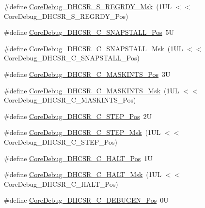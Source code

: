 \begin{DoxyCompactItemize}
\item 
\#define \hyperlink{group___c_m_s_i_s___core_debug_gac4cd6f3178de48f473d8903e8c847c07}{Core\-Debug\-\_\-\-D\-H\-C\-S\-R\-\_\-\-S\-\_\-\-R\-E\-G\-R\-D\-Y\-\_\-\-Msk}~(1\-U\-L $<$$<$ Core\-Debug\-\_\-\-D\-H\-C\-S\-R\-\_\-\-S\-\_\-\-R\-E\-G\-R\-D\-Y\-\_\-\-Pos)
\item 
\#define \hyperlink{group___c_m_s_i_s___core_debug_ga85747214e2656df6b05ec72e4d22bd6d}{Core\-Debug\-\_\-\-D\-H\-C\-S\-R\-\_\-\-C\-\_\-\-S\-N\-A\-P\-S\-T\-A\-L\-L\-\_\-\-Pos}~5\-U
\item 
\#define \hyperlink{group___c_m_s_i_s___core_debug_ga53aa99b2e39a67622f3b9973e079c2b4}{Core\-Debug\-\_\-\-D\-H\-C\-S\-R\-\_\-\-C\-\_\-\-S\-N\-A\-P\-S\-T\-A\-L\-L\-\_\-\-Msk}~(1\-U\-L $<$$<$ Core\-Debug\-\_\-\-D\-H\-C\-S\-R\-\_\-\-C\-\_\-\-S\-N\-A\-P\-S\-T\-A\-L\-L\-\_\-\-Pos)
\item 
\#define \hyperlink{group___c_m_s_i_s___core_debug_ga0d2907400eb948a4ea3886ca083ec8e3}{Core\-Debug\-\_\-\-D\-H\-C\-S\-R\-\_\-\-C\-\_\-\-M\-A\-S\-K\-I\-N\-T\-S\-\_\-\-Pos}~3\-U
\item 
\#define \hyperlink{group___c_m_s_i_s___core_debug_ga77fe1ef3c4a729c1c82fb62a94a51c31}{Core\-Debug\-\_\-\-D\-H\-C\-S\-R\-\_\-\-C\-\_\-\-M\-A\-S\-K\-I\-N\-T\-S\-\_\-\-Msk}~(1\-U\-L $<$$<$ Core\-Debug\-\_\-\-D\-H\-C\-S\-R\-\_\-\-C\-\_\-\-M\-A\-S\-K\-I\-N\-T\-S\-\_\-\-Pos)
\item 
\#define \hyperlink{group___c_m_s_i_s___core_debug_gae1fc39e80de54c0339cbb1b298a9f0f9}{Core\-Debug\-\_\-\-D\-H\-C\-S\-R\-\_\-\-C\-\_\-\-S\-T\-E\-P\-\_\-\-Pos}~2\-U
\item 
\#define \hyperlink{group___c_m_s_i_s___core_debug_gae6bda72fbd32cc5734ff3542170dc00d}{Core\-Debug\-\_\-\-D\-H\-C\-S\-R\-\_\-\-C\-\_\-\-S\-T\-E\-P\-\_\-\-Msk}~(1\-U\-L $<$$<$ Core\-Debug\-\_\-\-D\-H\-C\-S\-R\-\_\-\-C\-\_\-\-S\-T\-E\-P\-\_\-\-Pos)
\item 
\#define \hyperlink{group___c_m_s_i_s___core_debug_gaddf1d43f8857e4efc3dc4e6b15509692}{Core\-Debug\-\_\-\-D\-H\-C\-S\-R\-\_\-\-C\-\_\-\-H\-A\-L\-T\-\_\-\-Pos}~1\-U
\item 
\#define \hyperlink{group___c_m_s_i_s___core_debug_ga1d905a3aa594eb2e8bb78bcc4da05b3f}{Core\-Debug\-\_\-\-D\-H\-C\-S\-R\-\_\-\-C\-\_\-\-H\-A\-L\-T\-\_\-\-Msk}~(1\-U\-L $<$$<$ Core\-Debug\-\_\-\-D\-H\-C\-S\-R\-\_\-\-C\-\_\-\-H\-A\-L\-T\-\_\-\-Pos)
\item 
\#define \hyperlink{group___c_m_s_i_s___core_debug_gab557abb5b172b74d2cf44efb9d824e4e}{Core\-Debug\-\_\-\-D\-H\-C\-S\-R\-\_\-\-C\-\_\-\-D\-E\-B\-U\-G\-E\-N\-\_\-\-Pos}~0\-U
$$
\end{DoxyCompactItemize}

